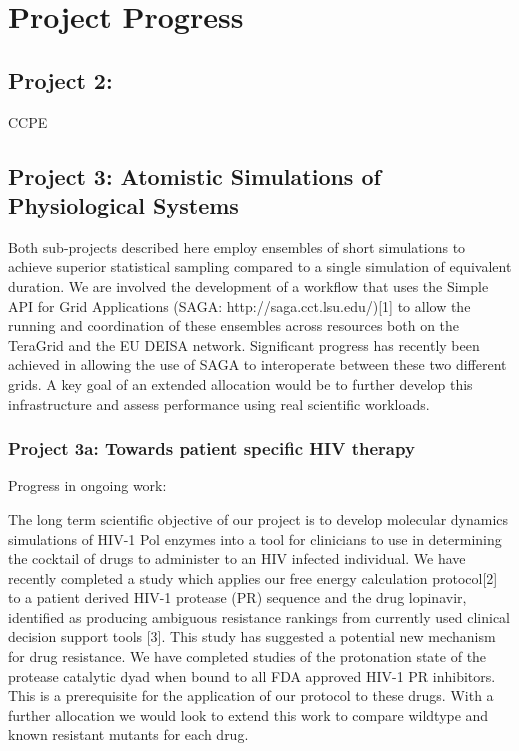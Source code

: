 \documentclass[a4paper,10pt]{article}
\begin{document}
\section{Project Progress}

\subsection{Project 2: }

CCPE

\subsection{Project 3: Atomistic Simulations of Physiological Systems}
Both sub-projects described here employ ensembles of short simulations to achieve superior
statistical sampling compared to a single simulation of equivalent duration. We are involved the development of a workflow that uses the Simple API for Grid Applications (SAGA: http://saga.cct.lsu.edu/)[1] to allow the running and coordination of these ensembles across resources both on the TeraGrid and the EU DEISA network. Significant progress has recently been achieved in allowing the use of SAGA to interoperate between these two different grids. A key goal of an extended allocation would be to further develop this infrastructure and assess performance using real scientific workloads.


\subsubsection{Project 3a: Towards patient specific HIV therapy}

Progress in ongoing work:

The long term scientific objective of our project is to develop molecular dynamics simulations of HIV-1 Pol enzymes into a tool for clinicians to use in determining the cocktail of drugs to administer to an HIV infected individual. We have recently completed a study which applies our free energy calculation protocol[2] to a patient derived HIV-1 protease (PR) sequence and the drug lopinavir, identified as producing ambiguous resistance rankings from currently used clinical decision support tools [3]. This study has suggested a potential new mechanism for drug resistance. We have completed studies of the protonation state of the protease catalytic dyad when bound to all FDA approved HIV-1 PR inhibitors. This is a prerequisite for the application of our protocol to these drugs. With a further allocation we would look to extend this work to compare wildtype and known resistant mutants for each drug.
\end{document}

